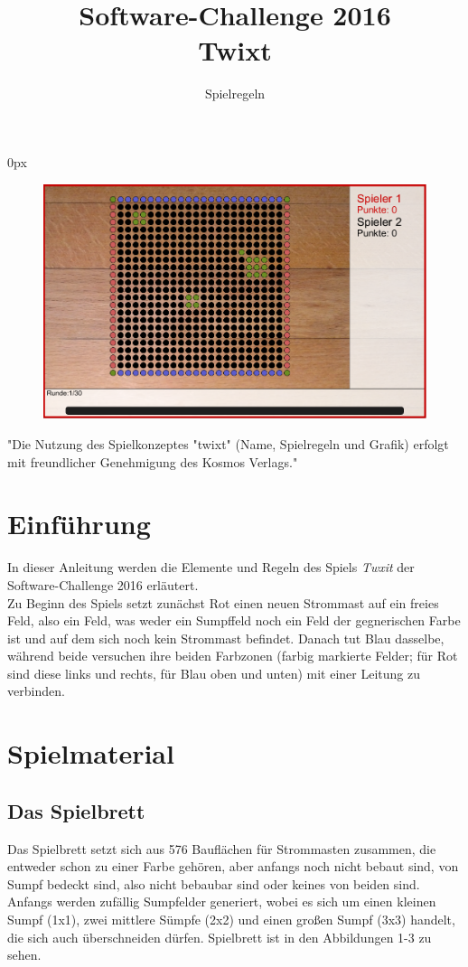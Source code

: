 \documentclass[a4paper, ngerman]{scrartcl}
\title{Software-Challenge 2016 \\ Twixt}
\subtitle{Spielregeln}
\begin{document}
 
\parindent0px
\maketitle

\begin{figure}[h!]
	\centering
	\includegraphics[width=\linewidth]{bilder/gui.png} 
\end{figure}
\vspace*{\fill}
"Die Nutzung des Spielkonzeptes "twixt" (Name, Spielregeln
und Grafik) erfolgt mit freundlicher Genehmigung des Kosmos Verlags."
\newpage
\tableofcontents
\newpage

\section{Einführung}
In dieser Anleitung werden die Elemente und Regeln des Spiels \emph{Twxit} der
Software-Challenge 2016 erläutert.\\
Zu Beginn des Spiels setzt zunächst Rot einen neuen Strommast auf ein freies
Feld, also ein Feld, was weder ein Sumpffeld noch ein Feld der gegnerischen
Farbe ist und auf dem sich noch kein Strommast befindet. Danach tut Blau
dasselbe, während beide versuchen ihre beiden Farbzonen (farbig markierte
Felder; für Rot sind diese links und rechts, für Blau  oben und unten) mit einer
Leitung zu verbinden.

\section{Spielmaterial}
	\subsection{Das Spielbrett}
Das Spielbrett setzt sich aus 576 Bauflächen für Strommasten zusammen,
die entweder schon zu einer Farbe gehören, aber anfangs noch nicht bebaut sind,
von Sumpf bedeckt sind, also nicht bebaubar sind oder keines von beiden sind.
Anfangs werden zufällig Sumpfelder generiert, wobei es sich um einen kleinen
Sumpf (1x1), zwei mittlere Sümpfe (2x2) und einen großen Sumpf (3x3) handelt,
die sich auch überschneiden dürfen. Spielbrett ist in den Abbildungen 1-3 zu
sehen.
\end{document}
